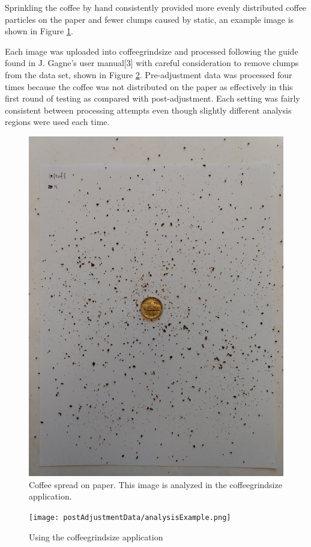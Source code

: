 \documentclass[10pt,a4paper,twocolumn,notitlepage]{article}
\begin{document}
Sprinkling the coffee by hand consistently provided more evenly distributed coffee particles on the paper and fewer clumps caused by static, an example image is shown in Figure \ref{fig:grindSample}.

Each image was uploaded into coffeegrindsize and processed following the guide found in J. Gagne's user manual[3] with careful consideration to remove clumps from the data set, shown in Figure \ref{fig:analysisExample}. Pre-adjustment data was processed four times because the coffee was not distributed on the paper as effectively in this first round of testing as compared with post-adjustment. Each setting was fairly consistent between processing attempts even though slightly different analysis regions were used each time. 

\begin{center}\begin{figure}[h!]
\includegraphics[width=\columnwidth]{postAdjustmentData/IMG_20191005_144811062.jpg}\caption{Coffee spread on paper. This image is analyzed in the coffeegrindsize application.}\label{fig:grindSample}\end{figure}\end{center}
\begin{center}\begin{figure}[h!]
 \texttt{[image: postAdjustmentData/analysisExample.png]}
 \caption{Using the coffeegrindsize application}\label{fig:analysisExample}\end{figure}\end{center}
\end{document}
